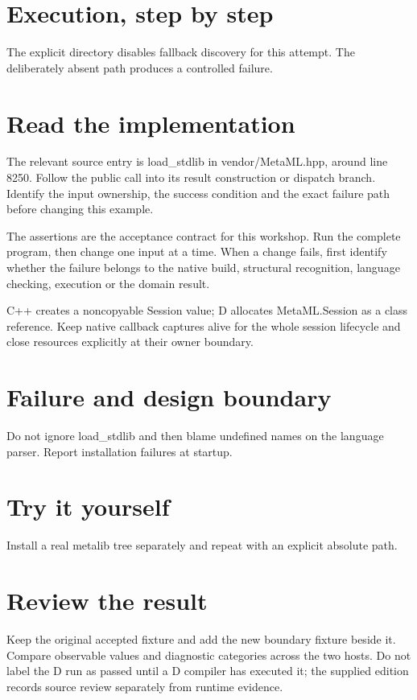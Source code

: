 
\section*{Execution, step by step}
The explicit directory disables fallback discovery for this attempt. The deliberately absent path produces a controlled failure.

\section*{Read the implementation}
The relevant source entry is load\_stdlib in vendor/MetaML.hpp, around line 8250. Follow the public call into its result construction or dispatch branch. Identify the input ownership, the success condition and the exact failure path before changing this example.

The assertions are the acceptance contract for this workshop. Run the complete program, then change one input at a time. When a change fails, first identify whether the failure belongs to the native build, structural recognition, language checking, execution or the domain result.

\clearpage
{}
C++ creates a noncopyable Session value; D allocates MetaML.Session as a class reference. Keep native callback captures alive for the whole session lifecycle and close resources explicitly at their owner boundary.


\section*{Failure and design boundary}
Do not ignore load\_stdlib and then blame undefined names on the language parser. Report installation failures at startup.

\section*{Try it yourself}
Install a real metalib tree separately and repeat with an explicit absolute path.

\section*{Review the result}
Keep the original accepted fixture and add the new boundary fixture beside it. Compare observable values and diagnostic categories across the two hosts. Do not label the D run as passed until a D compiler has executed it; the supplied edition records source review separately from runtime evidence.

